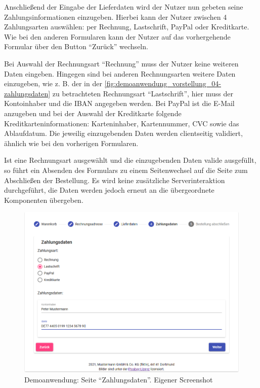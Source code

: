 Anschließend der Eingabe der Lieferdaten wird der Nutzer nun gebeten seine Zahlungsinformationen einzugeben. Hierbei kann der Nutzer zwischen 4 Zahlungsarten auswählen: per Rechnung, Lastschrift, PayPal oder Kreditkarte. Wie bei den anderen Formularen kann der Nutzer auf das vorhergehende Formular über den Button \enquote{Zurück} wechseln.

Bei Auswahl der Rechnungsart \enquote{Rechnung} muss der Nutzer keine weiteren Daten eingeben. Hingegen sind bei anderen Rechnungsarten weitere Daten einzugeben, wie z. B. der in der \autoref{fig:demoanwendung_vorstellung_04-zahlungsdaten} zu betrachteten Rechnungsart \enquote{Lastschrift}, hier muss der Kontoinhaber und die IBAN angegeben werden. Bei PayPal ist die E-Mail anzugeben und bei der Auswahl der Kreditkarte folgende Kreditkarteninformationen: Karteninhaber, Kartennummer, CVC sowie das Ablaufdatum. Die jeweilig einzugebenden Daten werden clientseitig validiert, ähnlich wie bei den vorherigen Formularen.

Ist eine Rechnungsart ausgewählt und die einzugebenden Daten valide ausgefüllt, so führt ein Absenden des Formulars zu einem Seitenwechsel auf die Seite zum Abschließen der Bestellung. Es wird keine zusätzliche Serverinteraktion durchgeführt, die Daten werden jedoch erneut an die übergeordnete Komponenten übergeben.

\begin{figure}[H]
	\centering
	\includegraphics[width=0.85\linewidth]{img/04_erstellung-poc/demoanwendung_vorstellung_04-zahlungsdaten.png}
	\caption{Demoanwendung: Seite \enquote{Zahlungsdaten}. Eigener Screenshot}
	\label{fig:demoanwendung_vorstellung_04-zahlungsdaten}
\end{figure}

